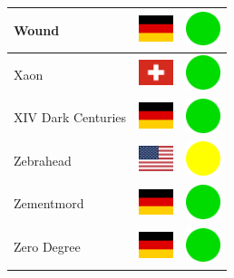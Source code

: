\documentclass[12pt, a4paper, twoside]{report}
\begin{document}
\begin{center}
\begin{longtable}{|p{5cm}|p{2cm}|p{2cm}|}
 Wound                                                      & \includegraphics[width=1cm]{../4x3/de} &   \includegraphics[width=1cm]{../likes/y} \\ \hline
 Xaon                                                       & \includegraphics[width=1cm]{../4x3/ch} &   \includegraphics[width=1cm]{../likes/y} \\ \hline
 XIV Dark Centuries                                         & \includegraphics[width=1cm]{../4x3/de} &   \includegraphics[width=1cm]{../likes/y} \\ \hline
 Zebrahead                                                  & \includegraphics[width=1cm]{../4x3/us} &   \includegraphics[width=1cm]{../likes/m} \\ \hline
 Zementmord                                                 & \includegraphics[width=1cm]{../4x3/de} &   \includegraphics[width=1cm]{../likes/y} \\ \hline
 Zero Degree                                                & \includegraphics[width=1cm]{../4x3/de} &   \includegraphics[width=1cm]{../likes/y} \\ \hline

\end{longtable}
\end{center}
\end{document}
